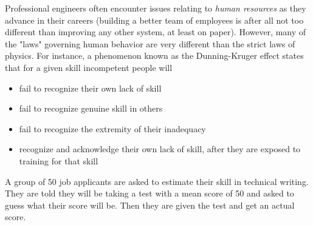 \documentclass[addpoints]{examsetup}
\begin{document}








\examCoverPage

\begin{questions}



\question

Professional engineers often encounter issues relating to \textit{human resources} as they advance in their careers
(building a better team of employees is after all not too different than improving any other system, at least on paper).
However, many of the "laws" governing human behavior are very different than the strict laws of physics.
For instance, a phenomenon known as the Dunning-Kruger effect states that for a given skill incompetent people will
\begin{itemize}
   \item fail to recognize their own lack of skill
   \item fail to recognize genuine skill in others
   \item fail to recognize the extremity of their inadequacy
   \item recognize and acknowledge their own lack of skill, after they are exposed to training for that skill
\end{itemize}

A group of 50 job applicants are asked to estimate their skill in technical writing. 
They are told they will be taking a test with a mean score of 50 and asked to guess what their score will be.
Then they are given the test and get an actual score. 



\end{questions}
\end{document}
